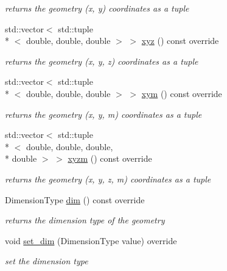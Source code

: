 \begin{DoxyCompactItemize}
\begin{DoxyCompactList}\small\item\em returns the geometry (x, y) coordinates as a tuple \end{DoxyCompactList}\item 
std\-::vector$<$ std\-::tuple\\*
$<$ double, double, double $>$ $>$ \hyperlink{classsimo_1_1shapes_1_1_basic_geometry_ad0098dca3aab7d3f710d21b672935570}{xyz} () const override
\begin{DoxyCompactList}\small\item\em returns the geometry (x, y, z) coordinates as a tuple \end{DoxyCompactList}\item 
std\-::vector$<$ std\-::tuple\\*
$<$ double, double, double $>$ $>$ \hyperlink{classsimo_1_1shapes_1_1_basic_geometry_ad6f72ade4686897fbea8f3b616b06df8}{xym} () const override
\begin{DoxyCompactList}\small\item\em returns the geometry (x, y, m) coordinates as a tuple \end{DoxyCompactList}\item 
std\-::vector$<$ std\-::tuple\\*
$<$ double, double, double, \\*
double $>$ $>$ \hyperlink{classsimo_1_1shapes_1_1_basic_geometry_a94dd1ee38d7b46ce92d1f547293fedce}{xyzm} () const override
\begin{DoxyCompactList}\small\item\em returns the geometry (x, y, z, m) coordinates as a tuple \end{DoxyCompactList}\item 
Dimension\-Type \hyperlink{classsimo_1_1shapes_1_1_basic_geometry_aa2cf098bf849207e3c1a638a31d28685}{dim} () const override
\begin{DoxyCompactList}\small\item\em returns the dimension type of the geometry \end{DoxyCompactList}\item 
void \hyperlink{classsimo_1_1shapes_1_1_basic_geometry_a203dc3ca9965a82151ec17299a429730}{set\-\_\-dim} (Dimension\-Type value) override
\begin{DoxyCompactList}\small\item\em set the dimension type \end{DoxyCompactList}\item 

\end{DoxyCompactItemize}
